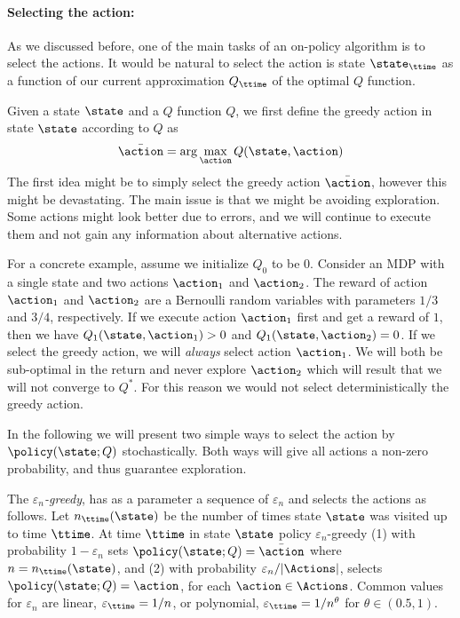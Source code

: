 \paragraph{Selecting the action:}
As we discussed before, one of the main tasks of an on-policy
algorithm is to select the actions. It would be natural to select
the action is state $\state_\ttime$ as a function of our current
approximation $Q_\ttime$ of the optimal $Q$ function.

Given a state $\state$ and a $Q$ function $Q$, we first define the
greedy action in state $\state$ according to $Q$ as
\[
\bar{\action}=\arg\max_\action Q(\state,\action)
\]
The first idea might be to simply select the greedy action
$\bar{\action}$, however this might be devastating. The main issue
is that we might be avoiding exploration. Some actions might look better
due to errors, and we will continue to execute them and not gain any
information about alternative actions.


For a concrete example, assume we initialize $Q_0$ to be $0$.
Consider an MDP with a single state and two actions $\action_1$ and
$\action_2$. The reward of action $\action_1$ and $\action_2$ are a
Bernoulli random variables with parameters $1/3$ and $3/4$,
respectively. If we execute action $\action_1$ first and get a
reward of $1$, then we have $Q_1(\state,\action_1)>0$ and
$Q_1(\state,\action_2)=0$. If we select the greedy action, we will
\emph{always} select action $\action_1$. We will both be sub-optimal
in the return and never explore $\action_2$ which will result that
we will not converge to $Q^*$. For this reason we would not select
deterministically the greedy action.


In the following we will present two simple ways to select the
action by $\policy(\state;Q)$ stochastically. Both ways will give
all actions a non-zero probability, and thus guarantee exploration.

The \emph{ $\varepsilon_n$-greedy}, has as a parameter a sequence of
$\varepsilon_n$ and selects the actions as follows. Let
$n_\ttime(\state)$ be the number of times state $\state$ was visited
up to time $\ttime$. At time $\ttime$ in state $\state$ policy
$\varepsilon_n$-greedy (1) with probability $1-\varepsilon_n$ sets
$\policy(\state;Q)=\bar{\action}$ where $n=n_\ttime(\state)$, and
(2) with probability $\varepsilon_n/|\Actions|$, selects
$\policy(\state;Q)=\action$, for each $\action \in \Actions$. Common
values for $\varepsilon_n$ are linear, $\varepsilon_\ttime=1/n$, or
polynomial, $\varepsilon_\ttime=1/n^\theta$ for $\theta\in(0.5,1)$.

